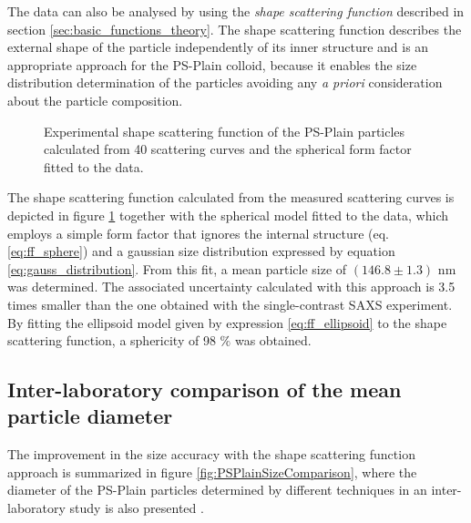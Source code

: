 The data can also be analysed by using the \emph{shape scattering function} described in section \ref{sec:basic_functions_theory}. The shape scattering function describes the external shape of the particle independently of its inner structure and is an appropriate approach for the PS-Plain colloid, because it enables the size distribution determination of the particles avoiding any \emph{a priori} consideration about the particle composition.

\begin{figure}
	\begin{center}
		
	\end{center}
	\caption[Experimental shape scattering function of the PS-Plain particles.]{Experimental shape scattering function of the PS-Plain particles calculated from 40 scattering curves and the spherical form factor fitted to the data.}
	\label{fig:PSPlainResonantTerm}
\end{figure}

The shape scattering function calculated from the measured scattering curves is depicted in figure \ref{fig:PSPlainResonantTerm} together with the spherical model fitted to the data, which employs a simple form factor that ignores the internal structure (eq. \ref{eq:ff_sphere}) and a gaussian size distribution expressed by equation \ref{eq:gauss_distribution}. From this fit, a mean particle size of $(146.8\pm1.3)$ nm was determined. The associated uncertainty calculated with this approach is 3.5 times smaller than the one obtained with the single-contrast SAXS experiment. By fitting the ellipsoid model given by expression \ref{eq:ff_ellipsoid} to the shape scattering function, a sphericity of 98 $\%$ was obtained.

\subsection{Inter-laboratory comparison of the mean particle diameter}
\label{sec:interlab_size_comparison}
The improvement in the size accuracy with the shape scattering function approach is summarized in figure \ref{fig:PSPlainSizeComparison}, where the diameter of the PS-Plain particles determined by different techniques in an inter-laboratory study is also presented \citep{nicolet_inter-laboratory_2016}.

\begin{figure*}
	\centering
		
	\caption[Comparison of the PS-Plain particles average diameter with different techniques.]{Comparison of the PS-Plain average diameter obtained with different techniques, where the errorbars correspond to the expanded uncertainty ($k=2$). The circles correspond to results obtained with SAXS in the FCM beamline and the diamond to combined DCS measurements performed in NPL. The gray line defines the weighted mean of all the independent results, employing in the case of SAXS the shape scattering function result. The microscopy values are obtained from Belgian Service Métrologie-Metrologische Dienst (SMD), Swiss Federal Institute of Metrology (METAS) and Dutch Metrology Institute (VSL).}
	\label{fig:PSPlainSizeComparison}
\end{figure*}

